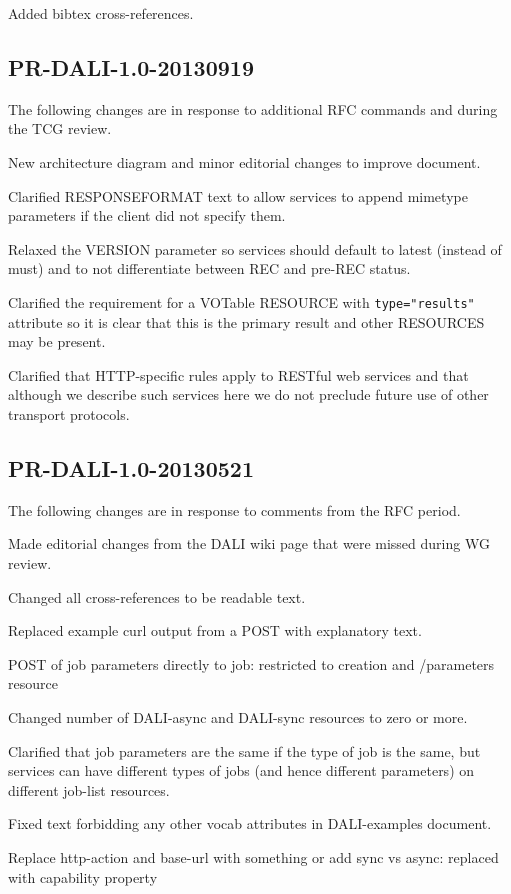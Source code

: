 \documentclass[11pt,letter]{ivoa}
\begin{document}
Added bibtex cross-references.

\subsection{PR-DALI-1.0-20130919}
The following changes are in response to additional RFC commands and during the 
TCG review.

New architecture diagram and minor editorial changes to improve document.

Clarified RESPONSEFORMAT text to allow services to append mimetype parameters if 
the client did not specify them.

Relaxed the VERSION parameter so services should default to latest (instead of 
must) and to not differentiate between REC and pre-REC status.

Clarified the requirement for a VOTable RESOURCE with \verb|type="results"| attribute 
so it is clear that this is the primary result and other RESOURCES may be 
present.

Clarified that HTTP-specific rules apply to RESTful web services and that 
although we describe such services here we do not preclude future use of other 
transport protocols.

\subsection{PR-DALI-1.0-20130521}
The following changes are in response to comments from the RFC period.

Made editorial changes from the DALI wiki page that were missed during WG 
review.

Changed all cross-references to be readable text.

Replaced example curl output from a POST with explanatory text.

POST of job parameters directly to job: restricted to creation and /parameters 
resource

Changed number of DALI-async and DALI-sync resources to zero or more.

Clarified that job parameters are the same if the type of job is the same, but 
services can have different types of jobs (and hence different parameters) on 
different job-list resources.

Fixed text forbidding any other vocab attributes in DALI-examples document.

Replace http-action and base-url with something or add sync vs async: replaced 
with capability property
\end{document}
